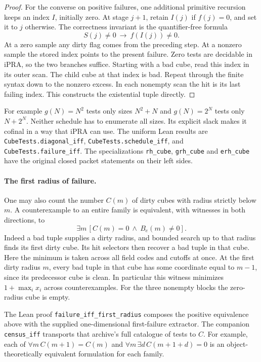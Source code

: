 \begin{proof}
For the converse on positive failures, one additional primitive
recursion keeps an index \(I\), initially zero. At stage \(j+1\),
retain \(I(j)\) if \(f(j)=0\), and set it to \(j\) otherwise.
The correctness invariant is the quantifier-free formula
\[
                 S(j)\ne0\ \longrightarrow\ f(I(j))\ne0 .
\]
At a zero sample any dirty flag comes from the preceding step.
At a nonzero sample the stored index points to the present failure.
Zero tests are decidable in iPRA, so the two branches suffice.
Starting with a bad cube, read this index in its outer scan. The child
cube at that index is bad. Repeat through the finite syntax down
to the nonzero excess. In each nonempty scan the hit is its last
failing index. This constructs the existential tuple directly.
\end{proof}

For example \(g(N)=N^2\) tests only sizes \(N^2+N\) and
\(g(N)=2^N\) tests only \(N+2^N\). Neither schedule has to enumerate
all sizes. Its explicit slack makes it cofinal in a way that iPRA can
use. The uniform Lean results are \texttt{CubeTests.diagonal\_iff},
\texttt{CubeTests.schedule\_iff}, and \texttt{CubeTests.failure\_iff}.
The specializations \texttt{rh\_cube}, \texttt{grh\_cube} and
\texttt{erh\_cube} have the original closed packet statements on their
left sides.

\paragraph{The first radius of failure.}
One may also count the number \(C(m)\) of dirty cubes with radius
strictly below \(m\). A counterexample to an entire family is
equivalent, with witnesses in both directions, to
\[
              \exists m\,[C(m)=0\ \land\ B_e(m)\ne0].
\]
Indeed a bad tuple supplies a dirty radius, and bounded search up to
that radius finds its first dirty cube. Its hit selectors then recover
a bad tuple in that cube. Here the minimum is taken across all field
codes and cutoffs at once. At the first dirty radius \(m\), every
bad tuple in that cube has some coordinate equal to \(m-1\), since its
predecessor cube is clean. In particular this witness minimizes
\(1+\max_i x_i\) across counterexamples. For the three nonempty blocks
the zero-radius cube is empty.

The Lean proof \texttt{failure\_iff\_first\_radius} composes
the positive equivalence above with the supplied one-dimensional
first-failure extractor. The companion \texttt{census\_iff}
transports that archive's full catalogue of tests to \(C\). For
example, each of \(\forall m\, C(m+1)=C(m)\) and
\(\forall m\,\exists d\, C(m+1+d)=0\) is an object-theoretically
equivalent formulation for each family.

